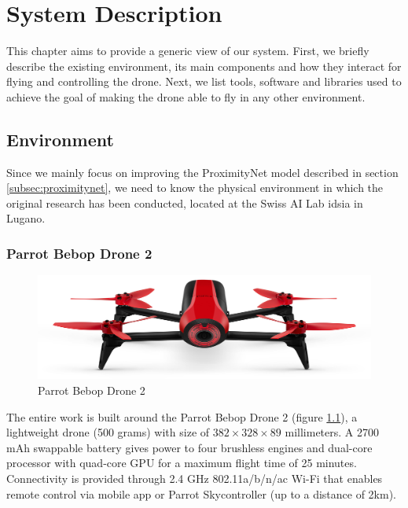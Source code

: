 \chapter{System Description}
\label{chap:system}


This chapter aims to provide a generic view of our system. First, we briefly describe the existing environment, its main components and how they interact for flying and controlling the drone. Next, we list tools, software and libraries used to achieve the goal of making the drone able to fly in any other environment. %




\section{Environment}
\label{sec:hardware}

Since we mainly focus on improving the ProximityNet model described in section \ref{subsec:proximitynet}, we need to know the physical environment in which the original research has been conducted, located at the Swiss AI Lab \gls{idsia} in Lugano.



\subsection{Parrot Bebop Drone 2}
\label{subsec:bebop}

\begin{figure}[!htb]
	\centering
	\includegraphics[width=.8\textwidth]{"contents/images/03-Parrot-Bebop-2"}
	\caption[Parrot Bebop Drone 2]{Parrot Bebop Drone 2}
	\label{fig:bebop}
\end{figure}

The entire work is built around the Parrot Bebop Drone 2 (figure \ref{fig:bebop}), a lightweight drone (500 grams) with size of $382 \times 328 \times 89$ millimeters. A 2700 mAh swappable battery gives power to four brushless engines and dual-core processor with quad-core GPU for a maximum flight time of 25 minutes. Connectivity is provided through 2.4 GHz 802.11a/b/n/ac Wi-Fi that enables remote control via mobile app or Parrot Skycontroller (up to a distance of 2km).


